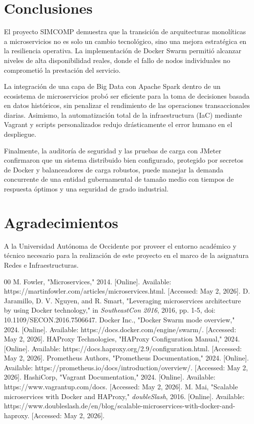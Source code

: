 \documentclass[conference]{IEEEtran}
\begin{document}
\section{Conclusiones}

El proyecto SIMCOMP demuestra que la transición de arquitecturas monolíticas a microservicios no es solo un cambio tecnológico, sino una mejora estratégica en la resiliencia operativa. La implementación de Docker Swarm permitió alcanzar niveles de alta disponibilidad reales, donde el fallo de nodos individuales no comprometió la prestación del servicio.

La integración de una capa de Big Data con Apache Spark dentro de un ecosistema de microservicios probó ser eficiente para la toma de decisiones basada en datos históricos, sin penalizar el rendimiento de las operaciones transaccionales diarias. Asimismo, la automatización total de la infraestructura (IaC) mediante Vagrant y scripts personalizados redujo drásticamente el error humano en el despliegue.

Finalmente, la auditoría de seguridad y las pruebas de carga con JMeter confirmaron que un sistema distribuido bien configurado, protegido por secretos de Docker y balanceadores de carga robustos, puede manejar la demanda concurrente de una entidad gubernamental de tamaño medio con tiempos de respuesta óptimos y una seguridad de grado industrial.

\section*{Agradecimientos}
A la Universidad Autónoma de Occidente por proveer el entorno académico y técnico necesario para la realización de este proyecto en el marco de la asignatura Redes e Infraestructuras.

\begin{thebibliography}{00}
 M. Fowler, "Microservices," 2014. [Online]. Available: https://martinfowler.com/articles/microservices.html. [Accessed: May 2, 2026].
 D. Jaramillo, D. V. Nguyen, and R. Smart, "Leveraging microservices architecture by using Docker technology," in \textit{SoutheastCon 2016}, 2016, pp. 1-5, doi: 10.1109/SECON.2016.7506647.
 Docker Inc., "Docker Swarm mode overview," 2024. [Online]. Available: https://docs.docker.com/engine/swarm/. [Accessed: May 2, 2026].
 HAProxy Technologies, "HAProxy Configuration Manual," 2024. [Online]. Available: https://docs.haproxy.org/2.9/configuration.html. [Accessed: May 2, 2026].
 Prometheus Authors, "Prometheus Documentation," 2024. [Online]. Available: https://prometheus.io/docs/introduction/overview/. [Accessed: May 2, 2026].
 HashiCorp, "Vagrant Documentation," 2024. [Online]. Available: https://www.vagrantup.com/docs. [Accessed: May 2, 2026].
 M. Mai, "Scalable microservices with Docker and HAProxy," \textit{doubleSlash}, 2016. [Online]. Available: https://www.doubleslash.de/en/blog/scalable-microservices-with-docker-and-haproxy. [Accessed: May 2, 2026].
\end{thebibliography}
\end{document}
